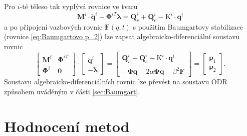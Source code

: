 Pro $ i $-té těleso tak vyplývá rovnice ve tvaru
\begin{equation}\label{eq:MBS_fin}
	\mathbf{M}^{i} \cdot \mathbf{\ddot{q}}^i -  \mathbf{\Phi}^{iT}\mathbf{\lambda}= \mathbf{Q}_{v}^{i} + \mathbf{Q}_{e}^{i} -  \mathrm{K}^i \cdot \mathbf{q}^i
\end{equation}
a po připojení vazbových rovnic $ \mathbf{F}(q,t) $ s použitím Baumgartovy stabilizace (rovnice \ref{eq:Baumgartovo p_2}) lze zapsat algebraicko-diferenciální soustavu rovnic
\begin{equation}\label{eq:MBS_alg-dif}
	\begin{bmatrix}
		\mathbf{M}^{i} & \mathbf{\Phi}^{iT} \\ 
		\mathbf{\Phi}^{i} & \mathbf{0}
	\end{bmatrix} 
	\cdot
	\begin{bmatrix}
		\mathbf{\ddot{q}}^i \\ 
		\mathbf{-\lambda}
	\end{bmatrix} =
	\begin{bmatrix}
		\mathbf{Q}_{v}^{i} + \mathbf{Q}_{e}^{i} -  \mathrm{K}^i \cdot \mathbf{q}^i \\ 
		- \mathbf{\dot{\Phi}}\mathbf{\dot{q}} - 2\alpha \mathbf{\Phi} \mathbf{q} - \beta^2\mathbf{F}
	\end{bmatrix} 
	=
	\begin{bmatrix}
		\mathbf{p}_1 \\ 
		\mathbf{p}_2
	\end{bmatrix} .
\end{equation}
Soustavu algebraicko-diferenciálních rovnic lze převést na soustavu ODR způsobem uváděným v části \ref{sec:Baumgart}.
\newpage
\section{Hodnocení metod}\label{sec:Hodnoceni metod}

